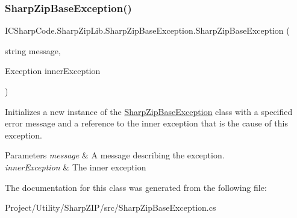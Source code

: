 \subsubsection{\texorpdfstring{Sharp\+Zip\+Base\+Exception()}{SharpZipBaseException()}\hspace{0.1cm}{\footnotesize\ttfamily [8/8]}}
{\footnotesize\ttfamily I\+C\+Sharp\+Code.\+Sharp\+Zip\+Lib.\+Sharp\+Zip\+Base\+Exception.\+Sharp\+Zip\+Base\+Exception (\begin{DoxyParamCaption}\item[{string}]{message,  }\item[{Exception}]{inner\+Exception }\end{DoxyParamCaption})\hspace{0.3cm}{\ttfamily [inline]}}



Initializes a new instance of the \hyperlink{class_i_c_sharp_code_1_1_sharp_zip_lib_1_1_sharp_zip_base_exception}{Sharp\+Zip\+Base\+Exception} class with a specified error message and a reference to the inner exception that is the cause of this exception. 


\begin{DoxyParams}{Parameters}
{\em message} & A message describing the exception.\\
\hline
{\em inner\+Exception} & The inner exception\\
\hline
\end{DoxyParams}


The documentation for this class was generated from the following file\+:\begin{DoxyCompactItemize}
\item 
Project/\+Utility/\+Sharp\+Z\+I\+P/src/Sharp\+Zip\+Base\+Exception.\+cs\end{DoxyCompactItemize}
